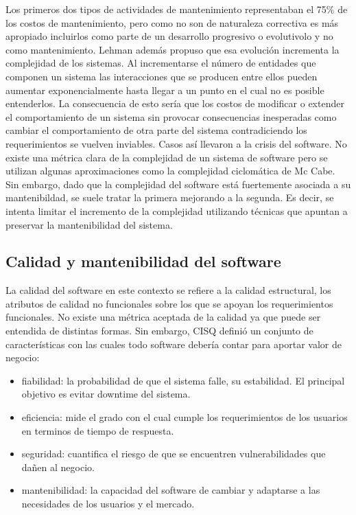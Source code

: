 Los primeros dos tipos de actividades de mantenimiento representaban el 75\% de
los costos de mantenimiento, pero como no son de naturaleza correctiva es más
apropiado incluirlos como parte de un desarrollo progresivo o evolutivolo y no
como mantenimiento. Lehman además propuso que esa evolución incrementa la
complejidad de los sistemas. Al incrementarse el número de entidades que
componen un sistema las interacciones que se producen entre ellos pueden
aumentar exponencialmente hasta llegar a un punto en el cual no es posible
entenderlos. La consecuencia de esto sería que los costos de modificar o
extender el comportamiento de un sistema sin provocar consecuencias inesperadas
como cambiar el comportamiento de otra parte del sistema contradiciendo los
requerimientos se vuelven inviables. Casos así
llevaron a la crisis del software. No existe una métrica clara de la complejidad
de un sistema de software pero se utilizan algunas aproximaciones
como la complejidad ciclomática de Mc Cabe. Sin embargo, dado que la complejidad
del software está fuertemente asociada a su mantenibildad, se suele tratar la
primera mejorando a la segunda. Es decir, se intenta limitar el incremento de la
complejidad utilizando técnicas que apuntan a preservar la mantenibilidad del
sistema.


\subsection{Calidad y mantenibilidad del software}
La calidad del software en este contexto se refiere a la calidad estructural,
los atributos de calidad no funcionales sobre los que se apoyan los
requerimientos funcionales. No existe una métrica aceptada
de la calidad ya que puede ser entendida de distintas formas. Sin embargo, CISQ
definió un conjunto de características con las cuales todo software debería
contar para aportar valor de negocio:

\begin{itemize}
    \item fiabilidad: la probabilidad de que el sistema falle, su
      estabilidad. El principal objetivo es evitar downtime del sistema.
    \item eficiencia: mide el grado con el cual cumple los requerimientos de los
      usuarios en terminos de tiempo de respuesta.
    \item seguridad: cuantifica el riesgo de que se encuentren vulnerabilidades
      que dañen al negocio.
    \item mantenibilidad: la capacidad del software de cambiar y adaptarse a las
      necesidades de los usuarios y el mercado.
\end{itemize}

